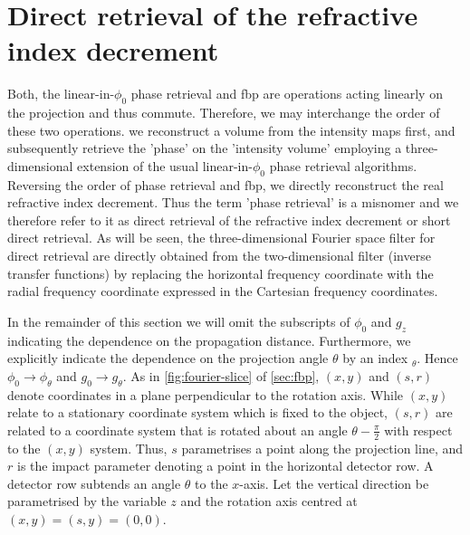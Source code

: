\documentclass[
twoside,
openright,
titlepage,
numbers=noenddot,
headinclude,
fleqn,
a4paper,
footinclude=true,
cleardoublepage=empty,
abstractoff,
BCOR=5mm,
paper=a4,
fontsize=11pt,
british,ngerman,american,
]{scrreprt}
\begin{document}

\section{Direct retrieval of the refractive index decrement}
\label{sec:direct-retrieval}
 
Both, the linear-in-$\phi_0$ phase retrieval and \ac{fbp} are
operations acting linearly on the projection and thus commute.
Therefore, we may interchange the order of these two operations.
\Ie{} we reconstruct a volume from the intensity maps first, and
subsequently retrieve the 'phase' on the 'intensity volume' employing
a three-dimensional extension of the usual linear-in-$\phi_0$ phase
retrieval algorithms.  Reversing the order of phase retrieval and
\ac{fbp}, we directly reconstruct the real refractive index decrement.
Thus the term 'phase retrieval' is a misnomer and we therefore refer
to it as direct retrieval of the refractive index decrement or short
direct retrieval.  As will be seen, the three-dimensional Fourier
space filter for direct retrieval are directly obtained from the
two-dimensional filter (inverse transfer functions) by replacing the
horizontal frequency coordinate with the radial frequency coordinate
expressed in the Cartesian frequency coordinates.

In the remainder of this section we will omit the subscripts of
$\phi_0$ and $g_z$ indicating the dependence on the propagation
distance.  Furthermore, we explicitly indicate the dependence on the
projection angle $\theta$ by an index $_\theta$.  Hence
$\phi_0\to\phi_\theta$ and $g_0\to g_\theta$.  As in
\cref{fig:fourier-slice} of \cref{sec:fbp}, $(x,y)$ and $(s,r)$ denote
coordinates in a plane perpendicular to the rotation axis.  While
$(x,y)$ relate to a stationary coordinate system which is fixed to the
object, $(s,r)$ are related to a coordinate system that is rotated
about an angle $\theta-\frac{\pi}{2}$ with respect to the $(x,y)$
system.  Thus, $s$ parametrises a point along the projection line, and
$r$ is the impact parameter denoting a point in the horizontal
detector row.   A detector row subtends an angle $\theta$ to the
$x$-axis.  Let the vertical direction be parametrised by the variable
$z$ and the rotation axis centred at $(x,y)=(s,y)=(0,0)$.
\end{document}
